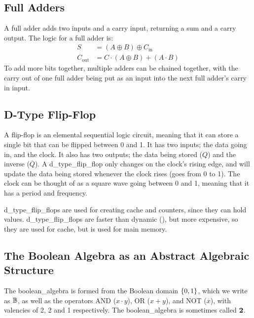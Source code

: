             \subsection{Full Adders}
                A full adder adds two inputs and a carry input, returning a sum and a carry output.
                The logic for a full adder is:
                \begin{equation}
                    \begin{aligned}
                        S&=(A\oplus B)\oplus C_\text{in} \\
                        C_\text{out}&=C\cdot(A\oplus B)+(A\cdot B)
                    \end{aligned}
                \end{equation}
                To add more bits together, multiple adders can be chained together, with the carry out of one full adder being put as an input into the next full adder's carry in input.

        \subsection{D-Type Flip-Flop}
            A flip-flop is an elemental sequential logic circuit, meaning that it can store a single bit that can be flipped between 0 and 1.
            It has two inputs; the data going in, and the clock.
            It also has two outputs; the data being stored ($Q$) and the inverse ($\overline{Q}$).
            A \gls{d_type_flip_flop} only changes on the clock's rising edge, and will update the data being stored whenever the clock rises (goes from 0 to 1).
            The clock can be thought of as a square wave going between 0 and 1, meaning that it has a period and frequency.

            \Glspl{d_type_flip_flop} are used for creating \gls{cache} and counters, since they can hold values.
            \Glspl{d_type_flip_flop} are faster than dynamic \acroRAM (\acroDRAM), but more expensive, so they are used for cache, but \acroDRAM is used for main \gls{memory}.
            
        \subsection{\texorpdfstring{The Boolean Algebra as an Abstract Algebraic \\ Structure}{The Boolean Algebra as an Abstract Algebraic Structure}}
            The \gls{boolean_algebra} is formed from the Boolean domain $\left\{0,1\right\}$, which we write as $\operatorname{\mathbb{B}}$, as well as the operators AND ($x\cdot y$), OR ($x+y$), and NOT ($\overline{x}$), with valencies of 2, 2 and 1 respectively.
            The \gls{boolean_algebra} is sometimes called $\operatorname{\mathbf{2}}$.

